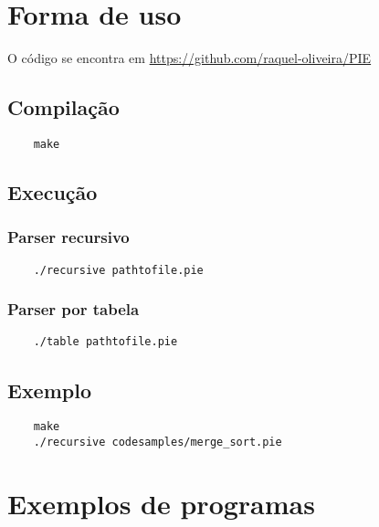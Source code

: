 \documentclass[12pt]{report}
\begin{document}
\newpage
\chapter{Forma de uso}
O código se encontra em \url{https://github.com/raquel-oliveira/PIE}
\section{Compilação}
\begin{verbatim}
    make
\end{verbatim}

\section{Execução}
\subsection{Parser recursivo}
\begin{verbatim}
    ./recursive pathtofile.pie
\end{verbatim}

\subsection{Parser por tabela}
\begin{verbatim}
    ./table pathtofile.pie
\end{verbatim}

\section{Exemplo}
\begin{verbatim}
    make
    ./recursive codesamples/merge_sort.pie
\end{verbatim}

\newpage
\chapter{Exemplos de programas}


\newpage
\end{document}
